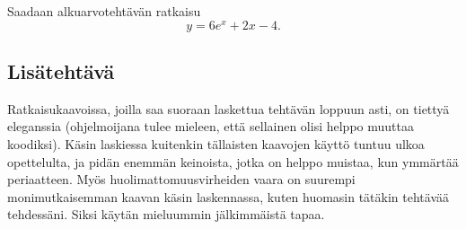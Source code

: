 \documentclass{article}
\begin{document}
Saadaan alkuarvotehtävän ratkaisu
\[
  y = 6e^x + 2x - 4.
\]

\subsection*{Lisätehtävä}

Ratkaisukaavoissa, joilla saa suoraan laskettua tehtävän loppuun asti, on
tiettyä eleganssia (ohjelmoijana tulee mieleen, että sellainen olisi helppo
muuttaa koodiksi). Käsin laskiessa kuitenkin tällaisten kaavojen käyttö tuntuu
ulkoa opettelulta, ja pidän enemmän keinoista, jotka on helppo muistaa, kun
ymmärtää periaatteen. Myös huolimattomuusvirheiden vaara on suurempi
monimutkaisemman kaavan käsin laskennassa, kuten huomasin tätäkin tehtävää
tehdessäni. Siksi käytän mieluummin jälkimmäistä tapaa.
\end{document}
